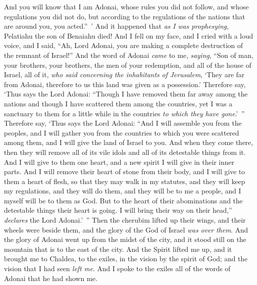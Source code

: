 \begin{biblechapter}
\verse And you will know that I am Adonai, whose rules you did not follow, and whose regulations you did not do, but according to the regulations of the nations that are around you, you acted.” ’
\verse And it happened that \textit{as I was prophesying}, Pelatiahu the son of Benaiahu died! And I fell on my face, and I cried with a loud voice, and I said, “Ah, Lord Adonai, you are making a complete destruction of the remnant of Israel!”
\verse And the word of Adonai \textit{came} to me, \textit{saying},
\verse “Son of man, your brothers, your brothers, the men of your redemption, and all of the house of Israel, all of it, \textit{who said concerning the inhabitants of Jerusalem}, ‘They are far from Adonai, therefore to us this land was given as a possession.’
\verse Therefore say, ‘Thus says the Lord Adonai: “Though I have removed them far away among the nations and though I have scattered them among the countries, yet I was a sanctuary to them for a little while in the countries \textit{to which they have gone}.’ ”
\verse Therefore say, ‘Thus says the Lord Adonai: “And I will assemble you from the peoples, and I will gather you from the countries to which you were scattered among them, and I will give the land of Israel to you.
\verse And when they come there, then they will remove all of its vile idols and all of its detestable things from it.
\verse And I will give to them one heart, and a new spirit I will give in their inner parts. And I will remove their heart of stone from their body, and I will give to them a heart of flesh,
\verse so that they may walk in my statutes, and they will keep my regulations, and they will do them, and they will be to me a people, and I myself will be to them as God.
\verse But to the heart of their abominations and the detestable things their heart is going. I will bring their way on their head,” \textit{declares} the Lord Adonai.’ ”
\verse Then the cherubim lifted up their wings, and their wheels were beside them, and the glory of the God of Israel \textit{was over them}.
\verse And the glory of Adonai went up from the midst of the city, and it stood still on the mountain that is to the east of the city.
\verse And the Spirit lifted me up, and it brought me to Chaldea, to the exiles, in the vision by the spirit of God; and the vision that I had seen \textit{left me}.
\verse And I spoke to the exiles all of the words of Adonai that he had shown me.
\end{biblechapter}

